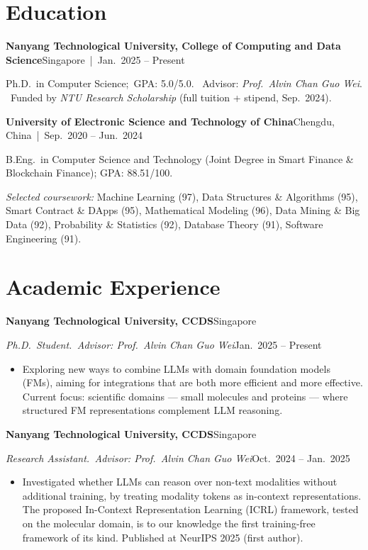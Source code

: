 \documentclass[10pt,a4paper]{article}
\newcommand{\row}[2]{\noindent\textbf{#1}\hfill #2\par}
\newcommand{\subrow}[2]{\noindent\textit{#1}\hfill #2\par}
\begin{document}
\section*{Education}

\row{Nanyang Technological University, College of Computing and Data Science}{Singapore \,|\, Jan.~2025 -- Present}
Ph.D.\ in Computer Science;\, GPA: 5.0/5.0. \,
Advisor: \textit{Prof.\ Alvin Chan Guo Wei}. \,
Funded by \textit{NTU Research Scholarship} (full tuition + stipend, Sep.~2024).

\vspace{4pt}
\row{University of Electronic Science and Technology of China}{Chengdu, China \,|\, Sep.~2020 -- Jun.~2024}
B.Eng.\ in Computer Science and Technology (Joint Degree in Smart Finance \& Blockchain Finance); GPA: 88.51/100.\par
{\small\textit{Selected coursework:} Machine Learning (97), Data Structures \& Algorithms (95), Smart Contract \& DApps (95), Mathematical Modeling (96), Data Mining \& Big Data (92), Probability \& Statistics (92), Database Theory (91), Software Engineering (91).}

\section*{Academic Experience}

\row{Nanyang Technological University, CCDS}{Singapore}
\subrow{Ph.D.\ Student.\, Advisor: Prof.\ Alvin Chan Guo Wei}{Jan.~2025 -- Present}
\begin{itemize}
  \item Exploring new ways to combine LLMs with domain foundation models (FMs), aiming for integrations that are both more efficient and more effective. Current focus: scientific domains --- small molecules and proteins --- where structured FM representations complement LLM reasoning.
\end{itemize}

\row{Nanyang Technological University, CCDS}{Singapore}
\subrow{Research Assistant.\, Advisor: Prof.\ Alvin Chan Guo Wei}{Oct.~2024 -- Jan.~2025}
\begin{itemize}
  \item Investigated whether LLMs can reason over non-text modalities without additional training, by treating modality tokens as in-context representations. The proposed In-Context Representation Learning (ICRL) framework, tested on the molecular domain, is to our knowledge the first training-free framework of its kind. Published at NeurIPS 2025 (first author).
\end{itemize}
\end{document}
